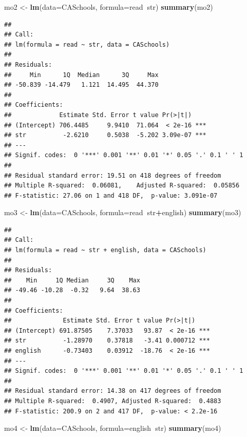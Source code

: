 \documentclass[
]{book}
\newenvironment{Shaded}{\begin{snugshade}}{\end{snugshade}}
\newcommand{\DataTypeTok}[1]{\textcolor[rgb]{0.13,0.29,0.53}{#1}}
\newcommand{\KeywordTok}[1]{\textcolor[rgb]{0.13,0.29,0.53}{\textbf{#1}}}
\newcommand{\NormalTok}[1]{#1}
\newcommand{\OperatorTok}[1]{\textcolor[rgb]{0.81,0.36,0.00}{\textbf{#1}}}
\newcommand{\StringTok}[1]{\textcolor[rgb]{0.31,0.60,0.02}{#1}}
\begin{document}
\begin{Shaded}
\begin{Highlighting}[]
\NormalTok{mo2 <-}\StringTok{ }\KeywordTok{lm}\NormalTok{(}\DataTypeTok{data=}\NormalTok{CASchools, }\DataTypeTok{formula=}\NormalTok{read}\OperatorTok{~}\NormalTok{str)}
\KeywordTok{summary}\NormalTok{(mo2)}
\end{Highlighting}
\end{Shaded}

\begin{verbatim}
## 
## Call:
## lm(formula = read ~ str, data = CASchools)
## 
## Residuals:
##     Min      1Q  Median      3Q     Max 
## -50.839 -14.479   1.121  14.495  44.370 
## 
## Coefficients:
##             Estimate Std. Error t value Pr(>|t|)    
## (Intercept) 706.4485     9.9410  71.064  < 2e-16 ***
## str          -2.6210     0.5038  -5.202 3.09e-07 ***
## ---
## Signif. codes:  0 '***' 0.001 '**' 0.01 '*' 0.05 '.' 0.1 ' ' 1
## 
## Residual standard error: 19.51 on 418 degrees of freedom
## Multiple R-squared:  0.06081,    Adjusted R-squared:  0.05856 
## F-statistic: 27.06 on 1 and 418 DF,  p-value: 3.091e-07
\end{verbatim}

\begin{Shaded}
\begin{Highlighting}[]
\NormalTok{mo3 <-}\StringTok{ }\KeywordTok{lm}\NormalTok{(}\DataTypeTok{data=}\NormalTok{CASchools, }\DataTypeTok{formula=}\NormalTok{read}\OperatorTok{~}\NormalTok{str}\OperatorTok{+}\NormalTok{english)}
\KeywordTok{summary}\NormalTok{(mo3)}
\end{Highlighting}
\end{Shaded}

\begin{verbatim}
## 
## Call:
## lm(formula = read ~ str + english, data = CASchools)
## 
## Residuals:
##    Min     1Q Median     3Q    Max 
## -49.46 -10.28  -0.32   9.64  38.63 
## 
## Coefficients:
##              Estimate Std. Error t value Pr(>|t|)    
## (Intercept) 691.87505    7.37033   93.87  < 2e-16 ***
## str          -1.28970    0.37818   -3.41 0.000712 ***
## english      -0.73403    0.03912  -18.76  < 2e-16 ***
## ---
## Signif. codes:  0 '***' 0.001 '**' 0.01 '*' 0.05 '.' 0.1 ' ' 1
## 
## Residual standard error: 14.38 on 417 degrees of freedom
## Multiple R-squared:  0.4907, Adjusted R-squared:  0.4883 
## F-statistic: 200.9 on 2 and 417 DF,  p-value: < 2.2e-16
\end{verbatim}

\begin{Shaded}
\begin{Highlighting}[]
\NormalTok{mo4 <-}\StringTok{ }\KeywordTok{lm}\NormalTok{(}\DataTypeTok{data=}\NormalTok{CASchools, }\DataTypeTok{formula=}\NormalTok{english}\OperatorTok{~}\NormalTok{str)}
\KeywordTok{summary}\NormalTok{(mo4)}
\end{Highlighting}
\end{Shaded}
\end{document}
